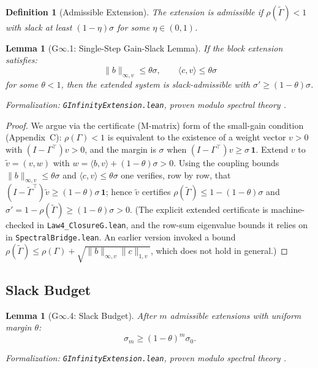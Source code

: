 \documentclass[12pt]{article}
\newtheorem{lemma}[theorem]{Lemma}
\newtheorem{definition}[theorem]{Definition}
\begin{document}
\begin{definition}[Admissible Extension]
The extension is \emph{admissible} if $\rho(\tilde{\Gamma}) < 1$ with slack at least $(1 - \eta)\sigma$ for some $\eta \in (0, 1)$.
\end{definition}

\begin{lemma}[G$\infty$.1: Single-Step Gain-Slack Lemma]
\label{lem:single-step}
If the block extension satisfies:
\[
\|b\|_{\infty, v} \leq \theta \sigma, \qquad \langle c, v \rangle \leq \theta \sigma
\]
for some $\theta < 1$, then the extended system is slack-admissible with $\sigma' \geq (1 - \theta)\sigma$.
\end{lemma}
\noindent\textit{Formalization: \texttt{GInfinityExtension.lean}, proven modulo spectral theory \citep{horn2012matrix}.}

\begin{proof}
We argue via the certificate (M-matrix) form of the small-gain condition (Appendix~C): $\rho(\Gamma) < 1$ is equivalent to the existence of a weight vector $v > 0$ with $(I - \Gamma^\top)v > 0$, and the margin is $\sigma$ when $(I - \Gamma^\top)v \geq \sigma\,\mathbf{1}$. Extend $v$ to $\tilde{v} = (v, w)$ with $w = \langle b, v\rangle + (1-\theta)\sigma > 0$. Using the coupling bounds $\|b\|_{\infty,v} \leq \theta\sigma$ and $\langle c, v\rangle \leq \theta\sigma$ one verifies, row by row, that $(I - \tilde{\Gamma}^\top)\tilde{v} \geq (1-\theta)\sigma\,\mathbf{1}$; hence $\tilde{v}$ certifies $\rho(\tilde{\Gamma}) \leq 1 - (1-\theta)\sigma$ and $\sigma' = 1 - \rho(\tilde{\Gamma}) \geq (1-\theta)\sigma > 0$. (The explicit extended certificate is machine-checked in \texttt{Law4\_ClosureG.lean}, and the row-sum eigenvalue bounds it relies on in \texttt{SpectralBridge.lean}. An earlier version invoked a bound $\rho(\tilde{\Gamma}) \leq \rho(\Gamma) + \sqrt{\|b\|_{\infty,v}\|c\|_{1,v}}$, which does not hold in general.)
\end{proof}

\subsection{Slack Budget}

\begin{lemma}[G$\infty$.4: Slack Budget]
\label{lem:slack-budget}
After $m$ admissible extensions with uniform margin $\theta$:
\[
\sigma_m \geq (1 - \theta)^m \sigma_0.
\]
\end{lemma}
\noindent\textit{Formalization: \texttt{GInfinityExtension.lean}, proven modulo spectral theory \citep{horn2012matrix}.}
\end{document}
